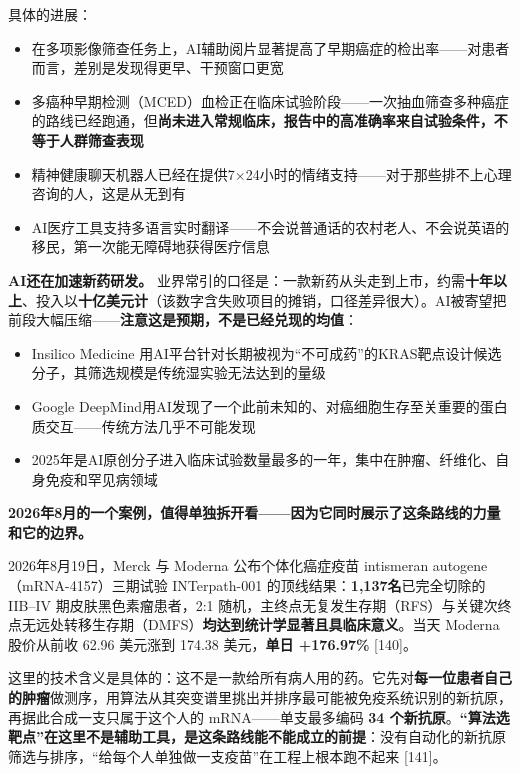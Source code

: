 \documentclass[11pt,a4paper]{ctexart}
\begin{document}
具体的进展：

\begin{itemize}
  \item 在多项影像筛查任务上，AI辅助阅片显著提高了早期癌症的检出率——对患者而言，差别是发现得更早、干预窗口更宽
  \item 多癌种早期检测（MCED）血检正在临床试验阶段——一次抽血筛查多种癌症的路线已经跑通，但\textbf{尚未进入常规临床，报告中的高准确率来自试验条件，不等于人群筛查表现}
  \item 精神健康聊天机器人已经在提供7$\times$24小时的情绪支持——对于那些排不上心理咨询的人，这是从无到有
  \item AI医疗工具支持多语言实时翻译——不会说普通话的农村老人、不会说英语的移民，第一次能无障碍地获得医疗信息
\end{itemize}

\textbf{AI还在加速新药研发。} 业界常引的口径是：一款新药从头走到上市，约需\textbf{十年以上}、投入以\textbf{十亿美元计}（该数字含失败项目的摊销，口径差异很大）。AI被寄望把前段大幅压缩——\textbf{注意这是预期，不是已经兑现的均值}：

\begin{itemize}
  \item Insilico Medicine 用AI平台针对长期被视为“不可成药”的KRAS靶点设计候选分子，其筛选规模是传统湿实验无法达到的量级
  \item Google DeepMind用AI发现了一个此前未知的、对癌细胞生存至关重要的蛋白质交互——传统方法几乎不可能发现
  \item 2025年是AI原创分子进入临床试验数量最多的一年，集中在肿瘤、纤维化、自身免疫和罕见病领域
\end{itemize}

\textbf{2026年8月的一个案例，值得单独拆开看——因为它同时展示了这条路线的力量和它的边界。}

2026年8月19日，Merck 与 Moderna 公布个体化癌症疫苗 intismeran autogene（mRNA-4157）三期试验 INTerpath-001 的顶线结果：\textbf{1,137名}已完全切除的 IIB–IV 期皮肤黑色素瘤患者，2:1 随机，主终点无复发生存期（RFS）与关键次终点无远处转移生存期（DMFS）\textbf{均达到统计学显著且具临床意义}。当天 Moderna 股价从前收 62.96 美元涨到 174.38 美元，\textbf{单日 +176.97\%}{} [140]。

这里的技术含义是具体的：这不是一款给所有病人用的药。它先对\textbf{每一位患者自己的肿瘤}做测序，用算法从其突变谱里挑出并排序最可能被免疫系统识别的新抗原，再据此合成一支只属于这个人的 mRNA——单支最多编码 \textbf{34 个新抗原}。\textbf{“算法选靶点”在这里不是辅助工具，是这条路线能不能成立的前提}：没有自动化的新抗原筛选与排序，“给每个人单独做一支疫苗”在工程上根本跑不起来 [141]。
\end{document}
